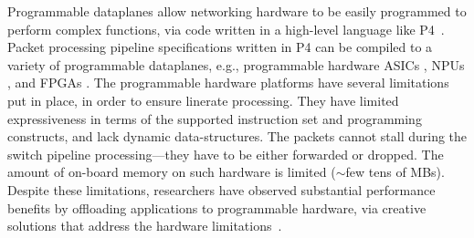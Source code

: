
Programmable dataplanes allow networking hardware to be easily programmed to perform complex functions, via code written in a high-level language like P4~\cite{p4}. Packet processing pipeline specifications written in P4 can be compiled to a variety of programmable dataplanes, e.g., programmable hardware ASICs \cite{flexpipe, doppler, cavium, tofino}, NPUs \cite{netronome, ezchip}, and FPGAs \cite{xilinx, altera}. The programmable hardware platforms have several limitations put in place, in order to ensure linerate processing. They have limited expressiveness in terms of the supported instruction set and programming constructs, and lack dynamic data-structures. The packets cannot stall during the switch pipeline processing---they have to be either forwarded or dropped. The amount of on-board memory on such hardware is limited ($\sim$few tens of MBs). Despite these limitations, researchers have observed substantial performance benefits by offloading applications to programmable hardware, via creative solutions that address the hardware limitations~\cite{int, hashpipe, network-heavy-hitter, carpe, appswitch, hula, silkroad, netpaxos, in-mem-consensus, netcache, kvdirect, acceltcp, switchml, dream,   blink, wharf}.



% 

